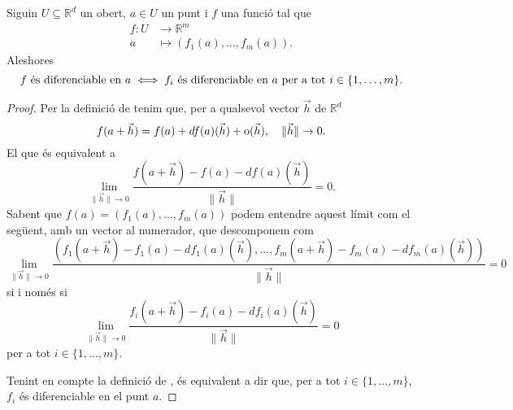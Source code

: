 \documentclass[../Apunts.tex]{subfiles}
\begin{document}
	\begin{proposition}
		\label{prop:diferenciable iff components diferenciables}
		Siguin \(U\subseteq\mathbb{R}^{d}\) un obert, \(a\in U\) un punt i \(f\) una funció tal que
		\begin{align*}
		f\colon U&\longrightarrow\mathbb{R}^{m}\\
		a&\longmapsto(f_{1}(a),\dots,f_{m}(a)).
		\end{align*}
		Aleshores
		\[f\text{ és diferenciable en }a\iff f_{i}\text{ és diferenciable en }a\text{ per a tot } i\in \{1,\dots,m\}.\]
		\begin{proof}
			Per la definició de  tenim que, per a qualsevol vector \(\vec{h}\) de \(\mathbb{R}^d\)
			\[f(a+\vec{h})=f(a)+df(a)(\vec{h})+\operatorname{o}(\vec{h}),\quad \lVert\vec{h}\rVert\to0.\]
			El que és equivalent a
			\[\lim_{\lVert\vec{h}\rVert\to0}\frac{f(a+\vec{h})-f(a)-df(a)(\vec{h})}{\lVert\vec{h}\rVert}=0.\]
			Sabent que \(f(a)=(f_{1}(a),\dots,f_{m}(a))\) podem entendre aquest límit com el següent, amb un vector al numerador, que descomponem com
			\[\lim_{\lVert\vec{h}\rVert\to0}\frac{(f_{1}(a+\vec{h})-f_{1}(a)-df_{1}(a)(\vec{h}),\dots,f_{m}(a+\vec{h})-f_{m}(a)-df_{m}(a)(\vec{h}))}{\lVert\vec{h}\rVert}=0\]
			si i només si%
			\[\lim_{\lVert\vec{h}\rVert\to0}\frac{f_{i}(a+\vec{h})-f_{i}(a)-df_{i}(a)(\vec{h})}{\lVert\vec{h}\rVert}=0\]
			per a tot \(i\in\{1,\dots,m\}\).
			
			Tenint en compte la definició de , és equivalent a dir que, per a tot \(i\in\{1,\dots,m\}\), \(f_{i}\) és diferenciable en el punt \(a\).
		\end{proof}
	\end{proposition}
\end{document}
